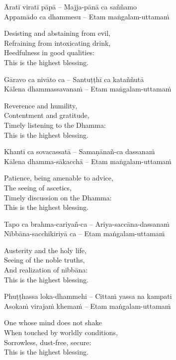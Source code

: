 Āratī viratī pāpā – Majja-pānā ca saññamo\\
Appamādo ca dhammesu – Etam maṅgalam-uttamaṁ

\begin{english}
  Desisting and abstaining from evil,\\
  Refraining from intoxicating drink,\\
  Heedfulness in good qualities:\\
  This is the highest blessing.
\end{english}

Gāravo ca nivāto ca – Santuṭṭhī ca kataññutā\\
Kālena dhammassavanaṁ – Etam maṅgalam-uttamaṁ

\begin{english}
  Reverence and humility,\\
  Contentment and gratitude,\\
  Timely listening to the Dhamma:\\
  This is the highest blessing.
\end{english}

Khantī ca sovacassatā – Samaṇānañ-ca dassanaṁ\\
Kālena dhamma-sākacchā – Etam maṅgalam-uttamaṁ

\begin{english}
  Patience, being amenable to advice,\\
  The seeing of ascetics,\\
  Timely discussion on the Dhamma:\\
  This is the highest blessing.
\end{english}

Tapo ca brahma-cariyañ-ca – Ariya-saccāna-dassanaṁ\\
Nibbāna-sacchikiriyā ca – Etam maṅgalam-uttamaṁ

\begin{english}
  Austerity and the holy life,\\
  Seeing of the noble truths,\\
  And realization of nibbāna:\\
  This is the highest blessing.
\end{english}

Phuṭṭhassa loka-dhammehi – Cittaṁ yassa na kampati\\
Asokaṁ virajaṁ khemaṁ – Etam maṅgalam-uttamaṁ

\begin{english}
  One whose mind does not shake\\
  When touched by worldly conditions,\\
  Sorrowless, dust-free, secure:\\
  This is the highest blessing.
\end{english}

